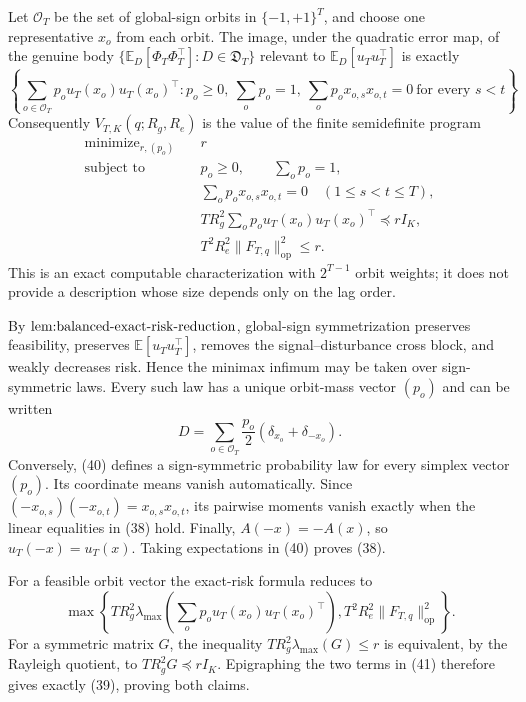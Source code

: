 Let \(\mathcal O_T\) be the set of global-sign orbits in \(\{-1,+1\}^T\), and choose one representative \(x_o\) from each orbit.  The image, under the quadratic error map, of the genuine body \(\{\mathbb E_D[\Phi_T\Phi_T^{\top}]:D\in\mathfrak D_T\}\) relevant to \(\mathbb E_D[u_Tu_T^{\top}]\) is exactly
\[
\left\{\sum_{o\in\mathcal O_T}p_o u_T(x_o)u_T(x_o)^{\top}:
p_o\ge0,\ \sum_op_o=1,\
\sum_op_o x_{o,s}x_{o,t}=0\ \text{for every }s<t\right\}. \tag{38}
\]
Consequently \(V_{T,K}(q;R_g,R_e)\) is the value of the finite semidefinite program
\[
\begin{aligned}
\operatorname{minimize}_{r,(p_o)}\quad&r\\
\text{subject to}\quad
&p_o\ge0,\qquad \sum_op_o=1,\\
&\sum_op_o x_{o,s}x_{o,t}=0\quad(1\le s<t\le T),\\
&TR_g^2\sum_op_o u_T(x_o)u_T(x_o)^{\top}\preceq rI_K,\\
&T^2R_e^2\|F_{T,q}\|_{\mathrm{op}}^2\le r.
\end{aligned} \tag{39}
\]
This is an exact computable characterization with \(2^{T-1}\) orbit weights; it does not provide a description whose size depends only on the lag order.

By \(\textnormal{lem:balanced-exact-risk-reduction}\), global-sign symmetrization preserves feasibility, preserves \(\mathbb E[u_Tu_T^{\top}]\), removes the signal--disturbance cross block, and weakly decreases risk.  Hence the minimax infimum may be taken over sign-symmetric laws.  Every such law has a unique orbit-mass vector \((p_o)\) and can be written
\[
D=\sum_{o\in\mathcal O_T}\frac{p_o}{2}(\delta_{x_o}+\delta_{-x_o}). \tag{40}
\]
Conversely, (40) defines a sign-symmetric probability law for every simplex vector \((p_o)\).  Its coordinate means vanish automatically.  Since \((-x_{o,s})(-x_{o,t})=x_{o,s}x_{o,t}\), its pairwise moments vanish exactly when the linear equalities in (38) hold.  Finally, \(A(-x)=-A(x)\), so \(u_T(-x)=u_T(x)\).  Taking expectations in (40) proves (38).

For a feasible orbit vector the exact-risk formula reduces to
\[
\max\!\left\{TR_g^2\lambda_{\max}\!\left(\sum_op_ou_T(x_o)u_T(x_o)^{\top}\right),
T^2R_e^2\|F_{T,q}\|_{\mathrm{op}}^2\right\}. \tag{41}
\]
For a symmetric matrix \(G\), the inequality \(TR_g^2\lambda_{\max}(G)\le r\) is equivalent, by the Rayleigh quotient, to \(TR_g^2G\preceq rI_K\).  Epigraphing the two terms in (41) therefore gives exactly (39), proving both claims.

